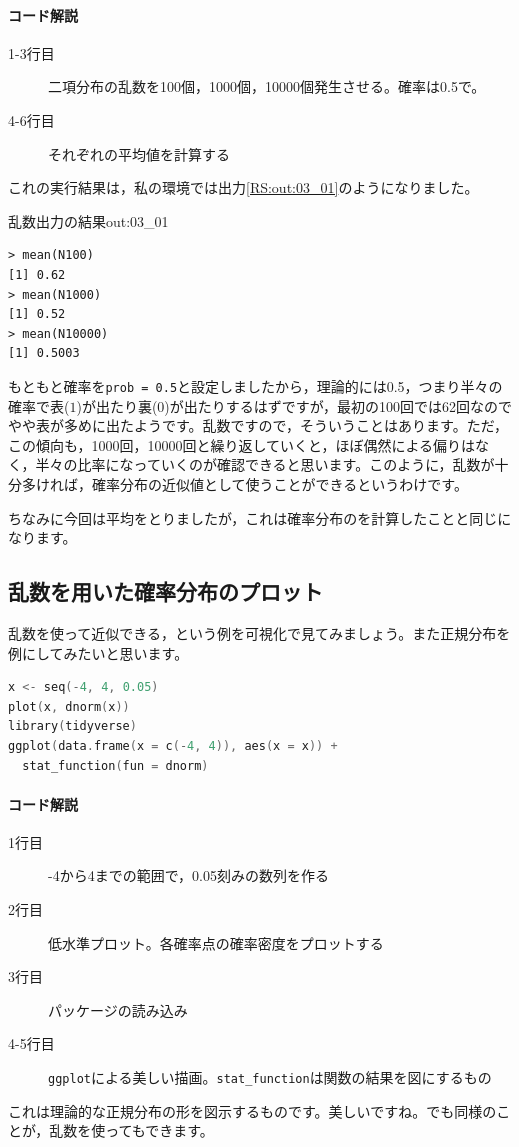 \documentclass{ltjsbook}
\begin{document}
\paragraph{コード解説}
\begin{description}
	\item[1-3行目] 二項分布の乱数を100個，1000個，10000個発生させる。確率は0.5で。
	\item[4-6行目] それぞれの平均値を計算する
\end{description}
これの実行結果は，私の環境では出力\ref{RS:out:03_01}のようになりました。
\begin{Rscreen}{乱数出力の結果}{out:03_01}
	\begin{verbatim}
> mean(N100)
[1] 0.62
> mean(N1000)
[1] 0.52
> mean(N10000)
[1] 0.5003\end{verbatim}
\end{Rscreen}

もともと確率を\texttt{prob = 0.5}と設定しましたから，理論的には0.5，つまり半々の確率で表($1$)が出たり裏($0$)が出たりするはずですが，最初の100回では62回なのでやや表が多めに出たようです。乱数ですので，そういうことはあります。ただ，この傾向も，1000回，10000回と繰り返していくと，ほぼ偶然による偏りはなく，半々の比率になっていくのが確認できると思います。このように，乱数が十分多ければ，確率分布の近似値として使うことができるというわけです。

ちなみに今回は平均をとりましたが，これは確率分布のを計算したことと同じになります。
\subsection{乱数を用いた確率分布のプロット}
乱数を使って近似できる，という例を可視化で見てみましょう。また正規分布を例にしてみたいと思います。
\begin{lstlisting}[language=c++,label={code:03_04},caption={確率分布の可視化1}]
x <- seq(-4, 4, 0.05)
plot(x, dnorm(x))
library(tidyverse)
ggplot(data.frame(x = c(-4, 4)), aes(x = x)) +
  stat_function(fun = dnorm)
\end{lstlisting}
\paragraph{コード解説}
\begin{description}
	\item[1行目] -4から4までの範囲で，0.05刻みの数列を作る
	\item[2行目] 低水準プロット。各確率点の確率密度をプロットする
	\item[3行目] パッケージの読み込み
	\item[4-5行目] \texttt{ggplot}による美しい描画。\verb|stat_function|は関数の結果を図にするもの
\end{description}
これは理論的な正規分布の形を図示するものです。美しいですね。でも同様のことが，乱数を使ってもできます。
\end{document}
